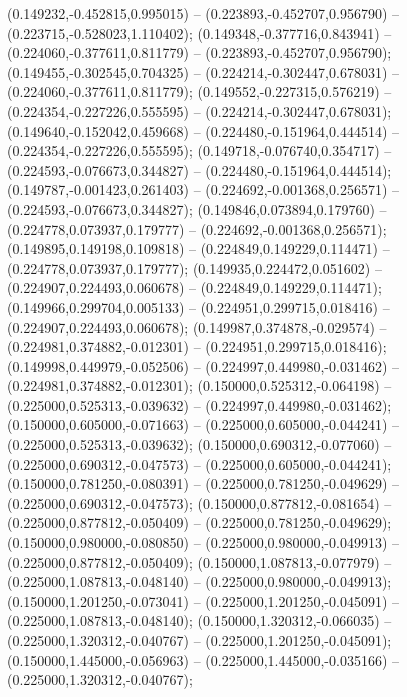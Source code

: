  (0.149232,-0.452815,0.995015) -- (0.223893,-0.452707,0.956790) -- (0.223715,-0.528023,1.110402);
 (0.149348,-0.377716,0.843941) -- (0.224060,-0.377611,0.811779) -- (0.223893,-0.452707,0.956790);
 (0.149455,-0.302545,0.704325) -- (0.224214,-0.302447,0.678031) -- (0.224060,-0.377611,0.811779);
 (0.149552,-0.227315,0.576219) -- (0.224354,-0.227226,0.555595) -- (0.224214,-0.302447,0.678031);
 (0.149640,-0.152042,0.459668) -- (0.224480,-0.151964,0.444514) -- (0.224354,-0.227226,0.555595);
 (0.149718,-0.076740,0.354717) -- (0.224593,-0.076673,0.344827) -- (0.224480,-0.151964,0.444514);
 (0.149787,-0.001423,0.261403) -- (0.224692,-0.001368,0.256571) -- (0.224593,-0.076673,0.344827);
 (0.149846,0.073894,0.179760) -- (0.224778,0.073937,0.179777) -- (0.224692,-0.001368,0.256571);
 (0.149895,0.149198,0.109818) -- (0.224849,0.149229,0.114471) -- (0.224778,0.073937,0.179777);
 (0.149935,0.224472,0.051602) -- (0.224907,0.224493,0.060678) -- (0.224849,0.149229,0.114471);
 (0.149966,0.299704,0.005133) -- (0.224951,0.299715,0.018416) -- (0.224907,0.224493,0.060678);
 (0.149987,0.374878,-0.029574) -- (0.224981,0.374882,-0.012301) -- (0.224951,0.299715,0.018416);
 (0.149998,0.449979,-0.052506) -- (0.224997,0.449980,-0.031462) -- (0.224981,0.374882,-0.012301);
 (0.150000,0.525312,-0.064198) -- (0.225000,0.525313,-0.039632) -- (0.224997,0.449980,-0.031462);
 (0.150000,0.605000,-0.071663) -- (0.225000,0.605000,-0.044241) -- (0.225000,0.525313,-0.039632);
 (0.150000,0.690312,-0.077060) -- (0.225000,0.690312,-0.047573) -- (0.225000,0.605000,-0.044241);
 (0.150000,0.781250,-0.080391) -- (0.225000,0.781250,-0.049629) -- (0.225000,0.690312,-0.047573);
 (0.150000,0.877812,-0.081654) -- (0.225000,0.877812,-0.050409) -- (0.225000,0.781250,-0.049629);
 (0.150000,0.980000,-0.080850) -- (0.225000,0.980000,-0.049913) -- (0.225000,0.877812,-0.050409);
 (0.150000,1.087813,-0.077979) -- (0.225000,1.087813,-0.048140) -- (0.225000,0.980000,-0.049913);
 (0.150000,1.201250,-0.073041) -- (0.225000,1.201250,-0.045091) -- (0.225000,1.087813,-0.048140);
 (0.150000,1.320312,-0.066035) -- (0.225000,1.320312,-0.040767) -- (0.225000,1.201250,-0.045091);
 (0.150000,1.445000,-0.056963) -- (0.225000,1.445000,-0.035166) -- (0.225000,1.320312,-0.040767);
